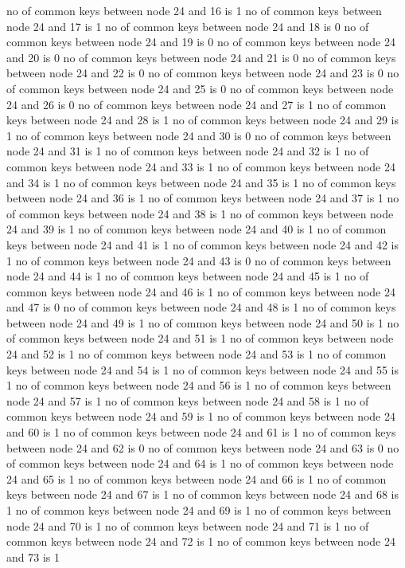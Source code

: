 no of common keys between node 24 and 16 is 1
no of common keys between node 24 and 17 is 1
no of common keys between node 24 and 18 is 0
no of common keys between node 24 and 19 is 0
no of common keys between node 24 and 20 is 0
no of common keys between node 24 and 21 is 0
no of common keys between node 24 and 22 is 0
no of common keys between node 24 and 23 is 0
no of common keys between node 24 and 25 is 0
no of common keys between node 24 and 26 is 0
no of common keys between node 24 and 27 is 1
no of common keys between node 24 and 28 is 1
no of common keys between node 24 and 29 is 1
no of common keys between node 24 and 30 is 0
no of common keys between node 24 and 31 is 1
no of common keys between node 24 and 32 is 1
no of common keys between node 24 and 33 is 1
no of common keys between node 24 and 34 is 1
no of common keys between node 24 and 35 is 1
no of common keys between node 24 and 36 is 1
no of common keys between node 24 and 37 is 1
no of common keys between node 24 and 38 is 1
no of common keys between node 24 and 39 is 1
no of common keys between node 24 and 40 is 1
no of common keys between node 24 and 41 is 1
no of common keys between node 24 and 42 is 1
no of common keys between node 24 and 43 is 0
no of common keys between node 24 and 44 is 1
no of common keys between node 24 and 45 is 1
no of common keys between node 24 and 46 is 1
no of common keys between node 24 and 47 is 0
no of common keys between node 24 and 48 is 1
no of common keys between node 24 and 49 is 1
no of common keys between node 24 and 50 is 1
no of common keys between node 24 and 51 is 1
no of common keys between node 24 and 52 is 1
no of common keys between node 24 and 53 is 1
no of common keys between node 24 and 54 is 1
no of common keys between node 24 and 55 is 1
no of common keys between node 24 and 56 is 1
no of common keys between node 24 and 57 is 1
no of common keys between node 24 and 58 is 1
no of common keys between node 24 and 59 is 1
no of common keys between node 24 and 60 is 1
no of common keys between node 24 and 61 is 1
no of common keys between node 24 and 62 is 0
no of common keys between node 24 and 63 is 0
no of common keys between node 24 and 64 is 1
no of common keys between node 24 and 65 is 1
no of common keys between node 24 and 66 is 1
no of common keys between node 24 and 67 is 1
no of common keys between node 24 and 68 is 1
no of common keys between node 24 and 69 is 1
no of common keys between node 24 and 70 is 1
no of common keys between node 24 and 71 is 1
no of common keys between node 24 and 72 is 1
no of common keys between node 24 and 73 is 1
